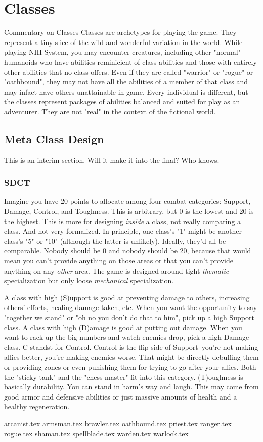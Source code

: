 \chapter{Classes}
\label{ch:classes}

\begin{DndComment}{Commentary on Classes}
Classes are archetypes for playing the game. They represent a tiny slice of the wild and wonderful variation in the world. While playing NIH System, you may encounter creatures, including other "normal" humanoids who have abilities reminicient of class abilities and those with entirely other abilities that no class offers. Even if they are called "warrior" or "rogue" or "oathbound", they may not have all the abilities of a member of that class and may infact have others unattainable in game. Every individual is different, but the classes represent packages of abilities balanced and suited for play as an adventurer. They are not "real" in the context of the fictional world.
\end{DndComment}

\section{Meta Class Design}
This is an interim section. Will it make it into the final? Who knows.

\subsection{SDCT}
Imagine you have 20 points to allocate among four combat categories: Support, Damage, Control, and Toughness. This is arbitrary, but 0 is the lowest and 20 is the highest. This is more for designing \textit{inside} a class, not really comparing a class. And not very formalized. In principle, one class's "1" might be another class's "5" or "10" (although the latter is unlikely). Ideally, they'd all be comparable. Nobody should be 0 and nobody should be 20, because that would mean you can't provide anything on those areas or that you can't provide anything on any \textit{other} area. The game is designed around tight \textit{thematic} specialization but only loose \textit{mechanical} specialization. 

A class with high (S)upport is good at preventing damage to others, increasing others' efforts, healing damage taken, etc. When you want the opportunity to say "together we stand" or "oh no you don't do that to him", pick up a high Support class. A class with high (D)amage is good at putting out damage. When you want to rack up the big numbers and watch enemies drop, pick a high Damage class. C standst for Control. Control is the flip side of Support--you're not making allies better, you're making enemies worse. That might be directly debuffing them or providing zones or even punishing them for trying to go after your allies. Both the "sticky tank" and the "chess master" fit into this category. (T)oughness is basically durability. You can stand in harm's way and laugh. This may come from good armor and defensive abilities or just massive amounts of health and a healthy regeneration.

{arcanist.tex}
{armsman.tex}
{brawler.tex}
{oathbound.tex}
{priest.tex}
{ranger.tex}
{rogue.tex}
{shaman.tex}
{spellblade.tex}
{warden.tex}
{warlock.tex}
